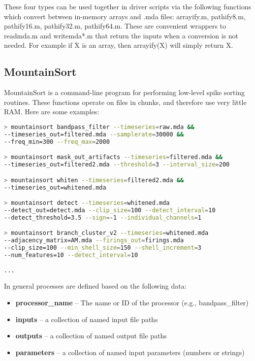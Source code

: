 \documentclass{article}
\begin{document}
These four types can be used together in driver scripts via the following functions which convert between in-memory arrays and .mda files: arrayify.m, pathify8.m, pathify16.m, pathify32.m, pathify64.m. These are convenient wrappers to readmda.m and writemda*.m that return the inputs when a conversion is not needed. For example if X is an array, then arrayify(X) will simply return X.

\subsection{MountainSort}

MountainSort is a command-line program for performing low-level spike sorting routines. These functions operate on files in chunks, and therefore use very little RAM. Here are some examples:
\begin{lstlisting}[language=bash]
> mountainsort bandpass_filter --timeseries=raw.mda &&
--timeseries_out=filtered.mda --samplerate=30000 &&
--freq_min=300 --freq_max=2000

> mountainsort mask_out_artifacts --timeseries=filtered.mda &&
--timeseries_out=filtered2.mda --threshold=3 --interval_size=200

> mountainsort whiten --timeseries=filtered2.mda &&
--timeseries_out=whitened.mda

> mountainsort detect --timeseries=whitened.mda
--detect_out=detect.mda --clip_size=100 --detect_interval=10
--detect_threshold=3.5 --sign=-1 --individual_channels=1

> mountainsort branch_cluster_v2 --timeseries=whitened.mda
--adjacency_matrix=AM.mda --firings_out=firings.mda
--clip_size=100 --min_shell_size=150 --shell_increment=3
--num_features=10 --detect_interval=10

...
\end{lstlisting}

In general processes are defined based on the following data:
\begin{itemize}
\item{\textbf{processor\_name} -- The name or ID of the processor (e.g., bandpass\_filter)}
\item{\textbf{inputs} -- a collection of named input file paths}
\item{\textbf{outputs} -- a collection of named output file paths}
\item{\textbf{parameters} -- a collection of named input parameters (numbers or strings)}
\end{itemize}
\end{document}
